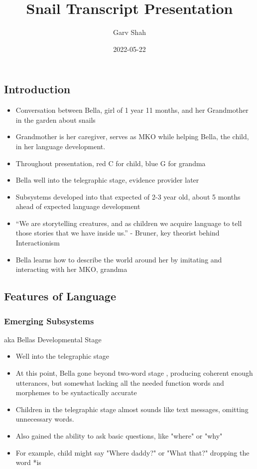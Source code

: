 \documentclass[
]{article}
\title{Snail Transcript Presentation}
\author{Garv Shah}
\date{2022-05-22}
\begin{document}
\maketitle

\hypertarget{introduction}{%
\subsection{Introduction}\label{introduction}}

\begin{itemize}
\item
  Conversation between Bella, girl of 1 year 11 months, and her
  Grandmother in the garden about snails
\item
  Grandmother is her caregiver, serves as MKO while helping Bella, the
  child, in her language development.
\item
  Throughout presentation, red C for child, blue G for grandma
\item
  Bella well into the telegraphic stage, evidence provider later
\item
  Subsystems developed into that expected of 2-3 year old, about 5
  months ahead of expected language development
\item
  ``We are storytelling creatures, and as children we acquire language
  to tell those stories that we have inside us.'' - Bruner, key theorist
  behind Interactionism
\item
  Bella learns how to describe the world around her by imitating and
  interacting with her MKO, grandma
\end{itemize}

\hypertarget{features-of-language}{%
\subsection{Features of Language}\label{features-of-language}}

\hypertarget{emerging-subsystems}{%
\subsubsection{Emerging Subsystems}\label{emerging-subsystems}}

aka Bella\textquotesingle s Developmental Stage

\begin{itemize}
\item
  Well into the telegraphic stage
\item
  At this point, Bella gone beyond two-word stage , producing coherent
  enough utterances, but somewhat lacking all the needed function words
  and morphemes to be syntactically accurate
\item
  Children in the telegraphic stage almost sounds like text messages,
  omitting unnecessary words.
\item
  Also gained the ability to ask basic questions, like "where" or "why"
\item
  For example, child might say "Where daddy?" or "What that?" dropping
  the word *is
\end{itemize}
\end{document}
